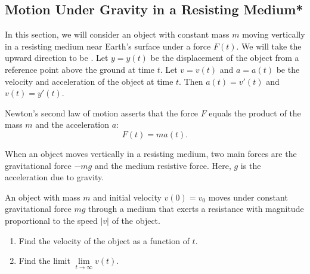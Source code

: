 \subsection{Motion Under Gravity in a Resisting Medium*}

In this section, we will consider an object with constant mass $m$ moving vertically in a resisting medium near Earth's surface under a force $F(t)$. We will take the {\color{red}upward} direction to be {\color{red}{positive}}. Let $y=y(t)$ be the displacement of the object from a reference point above the ground at time $t$. Let $v=v(t)$ and $a=a(t)$ be the velocity and acceleration of the object at time $t$. Then $a(t)=v'(t)$ and $v(t)=y'(t)$.

Newton’s second law of motion asserts that the force $F$ equals the product of the mass $m$ and the acceleration $a$:
\[F(t)=ma(t).\]

When an object moves vertically in a resisting medium, two main forces are the gravitational force $-mg$ and the medium resistive force. Here, $g$ is the acceleration due to gravity.

\begin{example}
  An object with mass $m$ and initial velocity $v(0)=v_0$ moves under constant gravitational force $mg$ through a medium that exerts a resistance with magnitude proportional to the speed $|v|$ of the object.
  \begin{enumerate}
    \item Find the velocity of the object as a function of $t$.
    \item Find the limit $\lim\limits_{t\to\infty}v(t)$.
  \end{enumerate}
\end{example}

